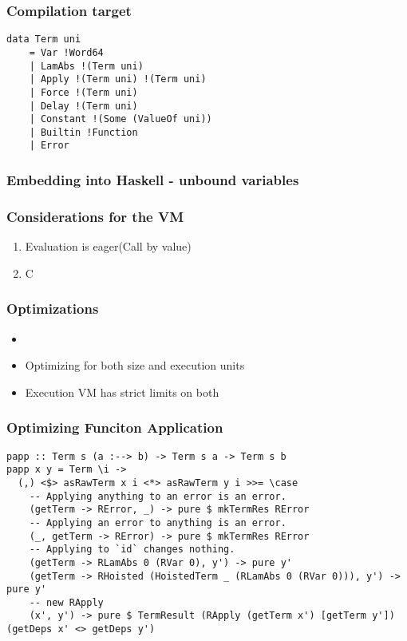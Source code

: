 \documentclass{beamer}
\begin{document}
\begin{frame}[containsverbatim]
  \frametitle{Compilation target}
\begin{verbatim}
data Term uni
    = Var !Word64
    | LamAbs !(Term uni)
    | Apply !(Term uni) !(Term uni)
    | Force !(Term uni)
    | Delay !(Term uni)
    | Constant !(Some (ValueOf uni))
    | Builtin !Function
    | Error
\end{verbatim}
\end{frame}

\begin{frame}
  \frametitle{Embedding into Haskell - unbound variables}

\end{frame}

\begin{frame}
  \frametitle{Considerations for the VM}
  \begin{enumerate}
  \item
    Evaluation is eager(Call by value)
  \item
    C
  \end{enumerate}
\end{frame}

\begin{frame}
  \frametitle{Optimizations}
  \begin{itemize}
    \item
    \item Optimizing for both size and execution units
    \item Execution VM has strict limits on both
    \end{itemize}
\end{frame}

\begin{frame}
\frametitle{Optimizing Funciton Application}
\begin{verbatim}
papp :: Term s (a :--> b) -> Term s a -> Term s b
papp x y = Term \i ->
  (,) <$> asRawTerm x i <*> asRawTerm y i >>= \case
    -- Applying anything to an error is an error.
    (getTerm -> RError, _) -> pure $ mkTermRes RError
    -- Applying an error to anything is an error.
    (_, getTerm -> RError) -> pure $ mkTermRes RError
    -- Applying to `id` changes nothing.
    (getTerm -> RLamAbs 0 (RVar 0), y') -> pure y'
    (getTerm -> RHoisted (HoistedTerm _ (RLamAbs 0 (RVar 0))), y') -> pure y'
    -- new RApply
    (x', y') -> pure $ TermResult (RApply (getTerm x') [getTerm y']) (getDeps x' <> getDeps y')
\end{verbatim}
\end{frame}
\end{document}
